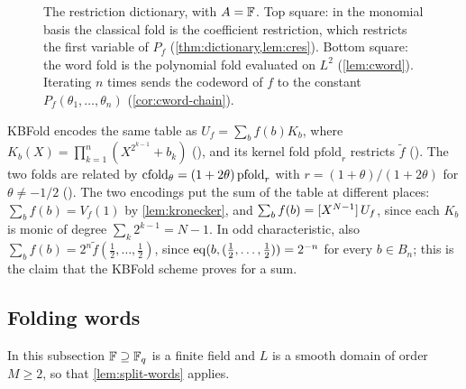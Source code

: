 \begin{figure}[t]
\centering
{}
\caption{The restriction dictionary, with $A = \mathbb{F}$. Top square: in the monomial basis the classical fold is the coefficient restriction, which restricts the first variable of $P_f$ (\cref{thm:dictionary,lem:cres}). Bottom square: the word fold is the polynomial fold evaluated on $L^2$ (\cref{lem:cword}). Iterating $n$ times sends the codeword of $f$ to the constant $P_f(\theta_1,\dots,\theta_n)$ (\cref{cor:cword-chain}).}
\label{fig:dictionary}
\end{figure}

\begin{remark}\label{rem:kernel-relation}
KBFold encodes the same table as $U_f = \sum_b f(b) K_b$, where $K_b(X) = \prod_{k=1}^n (X^{2^{k-1}} + b_k)$ (), and its kernel fold $\mathrm{pfold}_r$ restricts $\tilde f$ ().
The two folds are related by $\mathrm{cfold}_\theta = (1 + 2\theta)\,\mathrm{pfold}_r$ with $r = (1+\theta)/(1+2\theta)$ for $\theta \ne -1/2$ ().
The two encodings put the sum of the table at different places: $\sum_b f(b) = V_f(1)$ by \cref{lem:kronecker}, and $\sum_b f(b) = [X^{N-1}]\,U_f$, since each $K_b$ is monic of degree $\sum_k 2^{k-1} = N-1$.
In odd characteristic, also $\sum_b f(b) = 2^n \tilde f(\tfrac12,\dots,\tfrac12)$, since $\mathrm{eq}(b, (\tfrac12,\dots,\tfrac12)) = 2^{-n}$ for every $b \in B_n$; this is the claim that the KBFold scheme proves for a sum.
\end{remark}

\subsection{Folding words}\label{sec:restriction:words}

In this subsection $\mathbb{F} \supseteq \mathbb{F}_q$ is a finite field and $L$ is a smooth domain of order $M \ge 2$, so that \cref{lem:split-words} applies.

